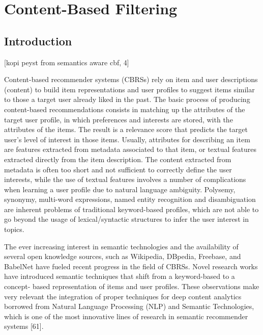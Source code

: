 
\section{Content-Based Filtering}\label{section:content_based_filtering}

\subsection{Introduction}

[kopi peyst from semantics aware cbf, 4]

Content-based recommender systems (CBRSs) rely on item and user descriptions (content) to build item representations and user profiles to suggest items similar to those a target user already liked in the past. The basic process of producing content-based recommendations consists in matching up the attributes of the target user profile, in which preferences and interests are stored, with the attributes of the items. The result is a relevance score that predicts the target user’s level of interest in those items. Usually, attributes for describing an item are features extracted from metadata associated to that item, or textual features extracted directly from the item description. The content extracted from metadata is often too short and not sufficient to correctly define the user interests, while the use of textual features involves a number of complications when learning a user profile due to natural language ambiguity. Polysemy, synonymy, multi-word expressions, named entity recognition and disambiguation are inherent problems of traditional keyword-based profiles, which are not able to go beyond the usage of lexical/syntactic structures to infer the user interest in topics.

The ever increasing interest in semantic technologies and the availability of several open knowledge sources, such as Wikipedia, DBpedia, Freebase, and BabelNet have fueled recent progress in the field of CBRSs. Novel research works have introduced semantic techniques that shift from a keyword-based to a concept- based representation of items and user profiles. These observations make very relevant the integration of proper techniques for deep content analytics borrowed from Natural Language Processing (NLP) and Semantic Technologies, which is one of the most innovative lines of research in semantic recommender systems [61].

